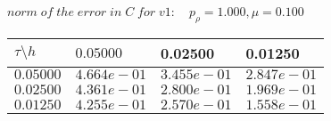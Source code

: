 
 $norm\;of\;the\;error\;in\;C\;for\;v1: \quad p_{\rho}=1.000, \mu = 0.100 $ \\ 
\begin{tabular}{|p{0.6in}|p{1.2in}|p{1.2in}|p{1.2in}|} \hline
$\tau\setminus h$ & $0.05000 $ & 0.02500 & 0.01250 \\ \hline
$0.05000$ & $4.664e-01$ &$3.455e-01$ &$2.847e-01$  \\ \hline
$0.02500$ & $4.361e-01$ &$2.800e-01$ &$1.969e-01$  \\ \hline
$0.01250$ & $4.255e-01$ &$2.570e-01$ &$1.558e-01$  \\ \hline
\end{tabular}\\[20pt]
